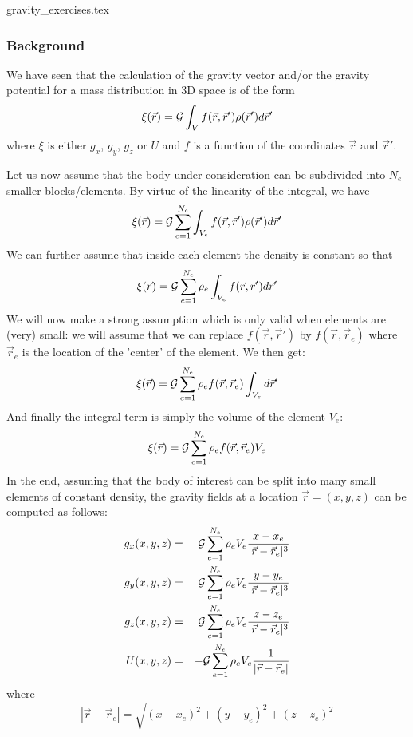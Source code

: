 \begin{flushright} {\tiny {\color{gray} gravity\_exercises.tex}} \end{flushright}




\subsubsection*{Background}

We have seen that the calculation of the gravity vector and/or the gravity potential 
for a mass distribution in 3D space is of the form 
\[
\xi(\vec{r})= {\cal G}  \int_V f(\vec{r},\vec{r}') \rho(\vec{r}') d\vec{r}'
\]
where $\xi$ is either $g_x$, $g_y$, $g_z$ or $U$ and $f$ is a function of the coordinates $\vec{r}$
and $\vec{r}'$.

Let us now assume that the body under consideration can be subdivided into $N_e$ smaller blocks/elements.
By virtue of the linearity of the integral, we have
\[
\xi(\vec{r})={\cal G} \sum_{e=1}^{N_e} \int_{V_e} f(\vec{r},\vec{r}') \rho(\vec{r}') d\vec{r}'
\]
We can further assume that inside each element the density is constant so that 
\[
\xi(\vec{r})={\cal G} \sum_{e=1}^{N_e} \rho_e \int_{V_e} f(\vec{r},\vec{r}') d\vec{r}'
\]
We will now make a strong assumption which is only valid when elements are (very) small:
we will assume that we can replace $f(\vec{r},\vec{r}')$ by $f(\vec{r},\vec{r}_e)$
where $\vec{r}_e$ is the location of the 'center' of the element. We then get:
\[
\xi(\vec{r})= {\cal G}\sum_{e=1}^{N_e} \rho_e  f(\vec{r},\vec{r}_e) \int_{V_e}d\vec{r}'
\]
And finally the integral term is simply the volume of the element $V_e$:
\[
\xi(\vec{r})= {\cal G} \sum_{e=1}^{N_e} \rho_e  f(\vec{r},\vec{r}_e) V_e
\]
In the end, assuming that the body of interest can be split into many small 
elements of constant density, the gravity fields at a location $\vec{r}=(x,y,z)$
can be computed as follows:
\begin{eqnarray}
g_x(x,y,z) &=& {\cal G} \sum_{e=1}^{N_e} \rho_e V_e  \frac{x-x_e}{|\vec{r}-\vec{r}_e|^3} \label{eq:gravdiscr1}\\
g_y(x,y,z) &=& {\cal G} \sum_{e=1}^{N_e} \rho_e V_e  \frac{y-y_e}{|\vec{r}-\vec{r}_e|^3} \label{eq:gravdiscr2}\\
g_z(x,y,z) &=& {\cal G} \sum_{e=1}^{N_e} \rho_e V_e  \frac{z-z_e}{|\vec{r}-\vec{r}_e|^3} \label{eq:gravdiscr3}\\
U(x,y,z)   &=& -{\cal G} \sum_{e=1}^{N_e} \rho_e V_e  \frac{1}{|\vec{r}-\vec{r}_e|}      \label{eq:gravdiscr4}
\end{eqnarray}
where 
\[
|\vec{r}-\vec{r}_e|=\sqrt{ (x-x_e)^2+(y-y_e)^2+(z-z_e)^2   }
\]

